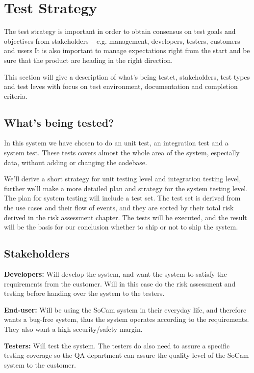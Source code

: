 \chapter{Test Strategy}


	The test strategy is important in order to obtain consensus on test goals and objectives from stakeholders – e.g. management, developers, testers, customers and users It is also important to manage expectations right from the start and be sure that the product are heading in the right direction.

	This section will give a description of what's being testet, stakeholders, test types and test leves with focus on test environment, documentation and completion criteria.

	\clearpage

	\section{What’s being tested?}

		In this system we have chosen to do  an unit test, 
		an integration test and a system test. 
		These tests covers almost the whole area of the system, especially data, without adding 
		or changing the codebase.

		We’ll derive a short strategy for unit testing level and integration testing level, further we’ll make a more detailed plan and strategy for the system testing level. The plan for system testing will include a test set. The test set is derived from the use cases and their flow of events, and they are sorted by their total risk derived in the risk assessment chapter. The tests will be executed, and the result will be the basis for our conclusion whether to ship or not to ship the system.

	\section{Stakeholders}

		{\bf Developers:} Will develop the system, and want the system to satisfy the requirements from the customer. Will in this case do the risk assessment and testing before handing over the system to the testers.

		{\bf End-user:} Will be using the SoCam system in their everyday life, and therefore wants a bug-free system, thus the system operates according to the requirements. They also want a high security/safety margin.

		{\bf Testers:} Will test the system. The testers do also need to assure a specific testing coverage so the QA department can assure the quality level of the SoCam system to the customer.   

